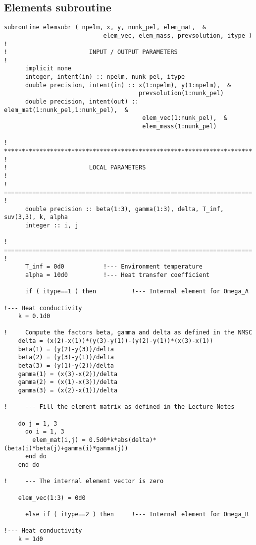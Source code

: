 \subsection{Elements subroutine}\label{ap:elem}
\begin{lstlisting}
subroutine elemsubr ( npelm, x, y, nunk_pel, elem_mat,  &
                            elem_vec, elem_mass, prevsolution, itype )
!
!                       INPUT / OUTPUT PARAMETERS
!
      implicit none
      integer, intent(in) :: npelm, nunk_pel, itype
      double precision, intent(in) :: x(1:npelm), y(1:npelm),  &
                                      prevsolution(1:nunk_pel)
      double precision, intent(out) :: elem_mat(1:nunk_pel,1:nunk_pel),  &
                                       elem_vec(1:nunk_pel),  &
                                       elem_mass(1:nunk_pel)

! **********************************************************************
!
!                       LOCAL PARAMETERS
!
! ======================================================================
!     
      double precision :: beta(1:3), gamma(1:3), delta, T_inf, suv(3,3), k, alpha
      integer :: i, j
      
! ======================================================================
!
      T_inf = 0d0			!--- Environment temperature
      alpha = 10d0			!--- Heat transfer coefficient
      
      if ( itype==1 ) then    		!--- Internal element for Omega_A

!--- Heat conductivity
	k = 0.1d0
      
!	  Compute the factors beta, gamma and delta as defined in the NMSC
	delta = (x(2)-x(1))*(y(3)-y(1))-(y(2)-y(1))*(x(3)-x(1))
	beta(1) = (y(2)-y(3))/delta
	beta(2) = (y(3)-y(1))/delta
	beta(3) = (y(1)-y(2))/delta
	gamma(1) = (x(3)-x(2))/delta
	gamma(2) = (x(1)-x(3))/delta
	gamma(3) = (x(2)-x(1))/delta
	
!     --- Fill the element matrix as defined in the Lecture Notes

	do j = 1, 3
	  do i = 1, 3
	    elem_mat(i,j) = 0.5d0*k*abs(delta)*(beta(i)*beta(j)+gamma(i)*gamma(j))
	  end do
	end do
	
!     --- The internal element vector is zero
  
	elem_vec(1:3) = 0d0
	
      else if ( itype==2 ) then	 	!--- Internal element for Omega_B
      
!--- Heat conductivity
	k = 1d0
      

\end{lstlisting}
